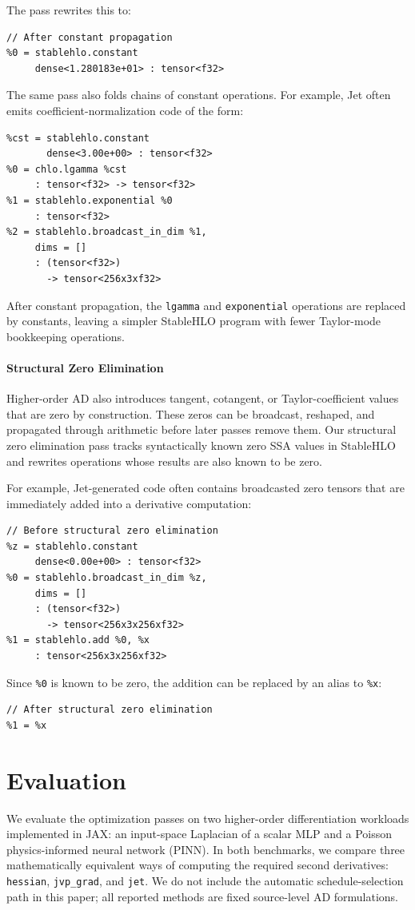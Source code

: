 \documentclass{article}
\theoremstyle{plain}
\theoremstyle{definition}
\theoremstyle{remark}
\begin{document}
The pass rewrites this to:
\begin{verbatim}
// After constant propagation
%0 = stablehlo.constant
     dense<1.280183e+01> : tensor<f32>
\end{verbatim}

The same pass also folds chains of constant operations. For example, Jet often
emits coefficient-normalization code of the form:
\begin{verbatim}
%cst = stablehlo.constant
       dense<3.00e+00> : tensor<f32>
%0 = chlo.lgamma %cst
     : tensor<f32> -> tensor<f32>
%1 = stablehlo.exponential %0
     : tensor<f32>
%2 = stablehlo.broadcast_in_dim %1,
     dims = []
     : (tensor<f32>)
       -> tensor<256x3xf32>
\end{verbatim}
After constant propagation, the \texttt{lgamma} and \texttt{exponential}
operations are replaced by constants, leaving a simpler StableHLO program with
fewer Taylor-mode bookkeeping operations.

\paragraph{Structural Zero Elimination}
Higher-order AD also introduces tangent, cotangent, or Taylor-coefficient
values that are zero by construction. These zeros can be broadcast, reshaped,
and propagated through arithmetic before later passes remove them. Our
structural zero elimination pass tracks syntactically known zero SSA values in
StableHLO and rewrites operations whose results are also known to be zero.

For example, Jet-generated code often contains broadcasted zero tensors that
are immediately added into a derivative computation:
\begin{verbatim}
// Before structural zero elimination
%z = stablehlo.constant
     dense<0.00e+00> : tensor<f32>
%0 = stablehlo.broadcast_in_dim %z,
     dims = []
     : (tensor<f32>)
       -> tensor<256x3x256xf32>
%1 = stablehlo.add %0, %x
     : tensor<256x3x256xf32>
\end{verbatim}

Since \texttt{\%0} is known to be zero, the addition can be replaced by an alias
to \texttt{\%x}:
\begin{verbatim}
// After structural zero elimination
%1 = %x
\end{verbatim}

\section{Evaluation}
We evaluate the optimization passes on two higher-order differentiation
workloads implemented in JAX: an input-space Laplacian of a scalar MLP and a
Poisson physics-informed neural network (PINN).  In both benchmarks, we compare
three mathematically equivalent ways of computing the required second
derivatives:
\texttt{hessian}, \texttt{jvp\_grad}, and \texttt{jet}.  We do not include the
automatic schedule-selection path in this paper; all reported methods are fixed
source-level AD formulations.
\end{document}
